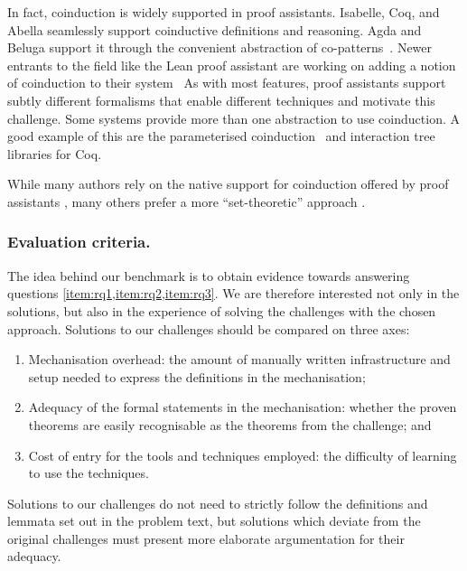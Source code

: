 \documentclass[runningheads]{llncs}
\begin{document}
In fact, coinduction is widely supported in proof assistants.
Isabelle, Coq, and Abella seamlessly support coinductive definitions and reasoning.
Agda and Beluga support it through the convenient abstraction of co-patterns~\cite{Abel2013}.
Newer entrants to the field like the Lean proof assistant
are working on adding a notion of coinduction to their system~\cite{Avigad2019}%
%
As with most features, proof assistants support
subtly different formalisms that enable different techniques and motivate this challenge.
Some systems provide more than one abstraction to use coinduction.
A good example of this are the parameterised coinduction~\cite{Hur2013}
and interaction tree~\cite{Xia2019} libraries for Coq.


While many authors rely on the native support for coinduction offered
by proof assistants
\cite{Honsell2001,Bengtson2016,Kahsai2008,Thiemann2019,Gay2020}, many
others prefer a more ``set-theoretic'' approach
\cite{Hirschkoff1997,Bengtson2009,Maksimovic2015,Pohjola2022}.

\subsubsection{Evaluation criteria.}
The idea behind our benchmark is to obtain evidence towards answering
questions \cref{item:rq1,item:rq2,item:rq3}. We are therefore
interested not only in the solutions, but also in the experience of
solving the challenges with the chosen approach.  Solutions to our
challenges should be compared on three axes:
\begin{enumerate}
\item Mechanisation overhead: the amount of manually written infrastructure and setup needed to express the definitions in the mechanisation;
\item Adequacy of the formal statements in the mechanisation: whether the proven theorems are easily recognisable as the theorems from the challenge; and
\item Cost of entry for the tools and techniques employed: the difficulty of learning to use the techniques.
\end{enumerate}
Solutions to our challenges do not need to strictly follow the definitions and lemmata set out in the problem text, but solutions which deviate from the original challenges must present more elaborate argumentation for their adequacy.
\end{document}

